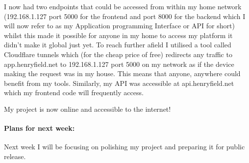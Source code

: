 I now had two endpoints that could be accessed from within my home network (192.168.1.127 port 5000 for the frontend and port 8000 for the backend which I will now refer to as my Application programming Interface or API for short) whilst this made it possible for anyone in my home to access my platform it didn't make it global just yet. To reach further afield I utilised a tool called Cloudflare tunnels which (for the cheap price of free) redirects any traffic to app.henryfield.net to 192.168.1.127 port 5000 on my network as if the device making the request was in my house. This means that anyone, anywhere could benefit from my tools. Similarly, my API was accessible at api.henryfield.net which my frontend code will frequently access.

My project is now online and accessible to the internet!

\paragraph{Plans for next week:}
Next week I will be focusing on polishing my project and preparing it for public release.